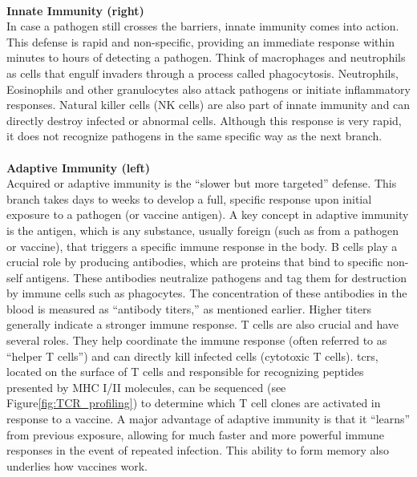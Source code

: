 \documentclass[12pt,a4paper]{report}
\begin{document}
\\
\textbf{Innate Immunity (right)}\\
In case a pathogen still crosses the barriers, innate immunity comes into action. This defense is rapid and non-specific, providing an immediate response within minutes to hours of detecting a pathogen. Think of macrophages and neutrophils as cells that engulf invaders through a process called phagocytosis. Neutrophils, Eosinophils and other granulocytes also attack pathogens or initiate inflammatory responses. Natural killer cells (NK cells) are also part of innate immunity and can directly destroy infected or abnormal cells. Although this response is very rapid, it does not recognize pathogens in the same specific way as the next branch. \cite{janeway2001immunobiology}\\
\\
\textbf{Adaptive Immunity (left)}\\
Acquired or adaptive immunity is the “slower but more targeted” defense. This branch takes days to weeks to develop a full, specific response upon initial exposure to a pathogen (or vaccine antigen). A key concept in adaptive immunity is the antigen, which is any substance, usually foreign (such as from a pathogen or vaccine), that triggers a specific immune response in the body. B cells play a crucial role by producing antibodies, which are proteins that bind to specific non-self antigens. These antibodies neutralize pathogens and tag them for destruction by immune cells such as phagocytes.
The concentration of these antibodies in the blood is measured as “antibody titers,” as mentioned earlier. Higher titers generally indicate a stronger immune response. T cells are also crucial and have several roles. They help coordinate the immune response (often referred to as “helper T cells”) and can directly kill infected cells (cytotoxic T cells). \glspl{tcr}, located on the surface of T cells and responsible for recognizing peptides presented by MHC I/II molecules, can be sequenced (see Figure\ref{fig:TCR_profiling}) to determine which T cell clones are activated in response to a vaccine. A major advantage of adaptive immunity is that it “learns” from previous exposure, allowing for much faster and more powerful immune responses in the event of repeated infection. This ability to form memory also underlies how vaccines work. \cite{janeway2001immunobiology}
\end{document}
